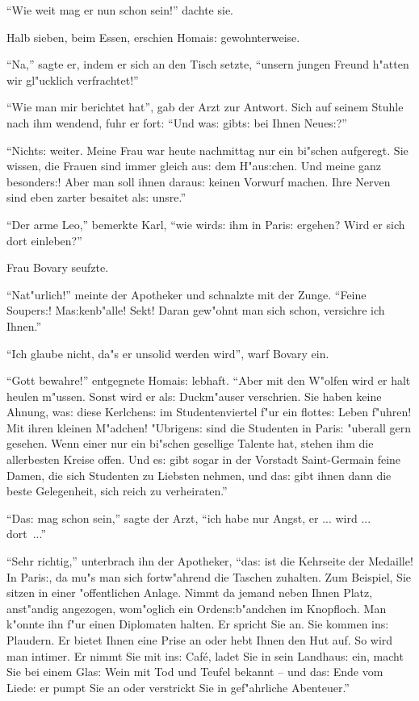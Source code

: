 \documentclass[oneside,12pt]{book}
\newcommand{\s}{s:}%
\begin{document}
"`Wie weit mag er nun schon sein!"' dachte sie.

Halb sieben, beim Essen, erschien Homai{\s} gewohnterweise.

"`Na,"' sagte er, indem er sich an den Tisch setzte, "`unsern
jungen Freund h"atten wir gl"ucklich verfrachtet!"'

"`Wie man mir berichtet hat"', gab der Arzt zur Antwort. Sich auf
seinem Stuhle nach ihm wendend, fuhr er fort: "`Und wa{\s}
gibt{\s} bei Ihnen Neue{\s}?"'

"`Nicht{\s} weiter. Meine Frau war heute nachmittag nur ein
bi"schen aufgeregt. Sie wissen, die Frauen sind immer gleich
au{\s} dem H"au{\s}chen. Und meine ganz besonder{\s}! Aber man
soll ihnen darau{\s} keinen Vorwurf machen. Ihre Nerven sind eben
zarter besaitet al{\s} unsre."'

"`Der arme Leo,"' bemerkte Karl, "`wie wird{\s} ihm in Pari{\s}
ergehen? Wird er sich dort einleben?"'

Frau Bovary seufzte.

"`Nat"urlich!"' meinte der Apotheker und schnalzte mit der Zunge.
"`Feine Souper{\s}! Ma{\s}kenb"alle! Sekt! Daran gew"ohnt man sich
schon, versichre ich Ihnen."'

"`Ich glaube nicht, da"s er unsolid werden wird"', warf Bovary
ein.

"`Gott bewahre!"' entgegnete Homai{\s} lebhaft. "`Aber mit den
W"olfen wird er halt heulen m"ussen. Sonst wird er al{\s}
Duckm"auser verschrien. Sie haben keine Ahnung, wa{\s} diese
Kerlchen{\s} im Studentenviertel f"ur ein flotte{\s} Leben
f"uhren! Mit ihren kleinen M"adchen! "Ubrigen{\s} sind die
Studenten in Pari{\s} "uberall gern gesehen. Wenn einer nur ein
bi"schen gesellige Talente hat, stehen ihm die allerbesten Kreise
offen. Und e{\s} gibt sogar in der Vorstadt Saint-Germain feine
Damen, die sich Studenten zu Liebsten nehmen, und da{\s} gibt
ihnen dann die beste Gelegenheit, sich reich zu verheiraten."'

"`Da{\s} mag schon sein,"' sagte der Arzt, "`ich habe nur Angst,
er ... wird ... dort~..."'

"`Sehr richtig,"' unterbrach ihn der Apotheker, "`da{\s} ist die
Kehrseite der Medaille! In Pari{\s}, da mu"s man sich fortw"ahrend
die Taschen zuhalten. Zum Beispiel, Sie sitzen in einer
"offentlichen Anlage. Nimmt da jemand neben Ihnen Platz,
anst"andig angezogen, wom"oglich ein Orden{\s}b"andchen im
Knopfloch. Man k"onnte ihn f"ur einen Diplomaten halten. Er
spricht Sie an. Sie kommen in{\s} Plaudern. Er bietet Ihnen eine
Prise an oder hebt Ihnen den Hut auf. So wird man intimer. Er
nimmt Sie mit in{\s} Caf\'e, ladet Sie in sein Landhau{\s} ein,
macht Sie bei einem Gla{\s} Wein mit Tod und Teufel bekannt -- und
da{\s} Ende vom Liede: er pumpt Sie an oder verstrickt Sie in
gef"ahrliche Abenteuer."'
\end{document}
